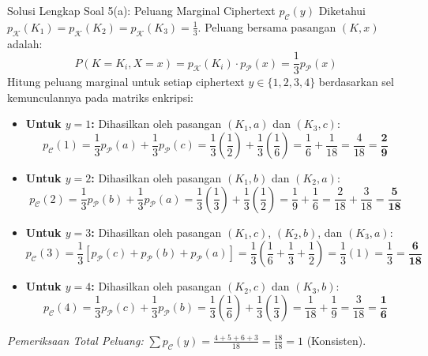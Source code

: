 \documentclass[11pt,a4paper]{article}
\begin{document}
\begin{solusibox}{Solusi Lengkap Soal 5(a): Peluang Marginal Ciphertext $p_{\mathcal{C}}(y)$}
Diketahui $p_{\mathcal{K}}(K_1) = p_{\mathcal{K}}(K_2) = p_{\mathcal{K}}(K_3) = \frac{1}{3}$. Peluang bersama pasangan $(K, x)$ adalah:
\[
P(K = K_i, X = x) = p_{\mathcal{K}}(K_i) \cdot p_{\mathcal{P}}(x) = \frac{1}{3} p_{\mathcal{P}}(x)
\]
Hitung peluang marginal untuk setiap ciphertext $y \in \{1, 2, 3, 4\}$ berdasarkan sel kemunculannya pada matriks enkripsi:
\begin{itemize}[leftmargin=*]
    \item \textbf{Untuk $y = 1$:} Dihasilkan oleh pasangan $(K_1, a)$ dan $(K_3, c)$:
    \[
    p_{\mathcal{C}}(1) = \frac{1}{3} p_{\mathcal{P}}(a) + \frac{1}{3} p_{\mathcal{P}}(c) = \frac{1}{3}\left(\frac{1}{2}\right) + \frac{1}{3}\left(\frac{1}{6}\right) = \frac{1}{6} + \frac{1}{18} = \frac{4}{18} = \mathbf{\frac{2}{9}}
    \]
    \item \textbf{Untuk $y = 2$:} Dihasilkan oleh pasangan $(K_1, b)$ dan $(K_2, a)$:
    \[
    p_{\mathcal{C}}(2) = \frac{1}{3} p_{\mathcal{P}}(b) + \frac{1}{3} p_{\mathcal{P}}(a) = \frac{1}{3}\left(\frac{1}{3}\right) + \frac{1}{3}\left(\frac{1}{2}\right) = \frac{1}{9} + \frac{1}{6} = \frac{2}{18} + \frac{3}{18} = \mathbf{\frac{5}{18}}
    \]
    \item \textbf{Untuk $y = 3$:} Dihasilkan oleh pasangan $(K_1, c)$, $(K_2, b)$, dan $(K_3, a)$:
    \[
    p_{\mathcal{C}}(3) = \frac{1}{3}\left[p_{\mathcal{P}}(c) + p_{\mathcal{P}}(b) + p_{\mathcal{P}}(a)\right] = \frac{1}{3}\left(\frac{1}{6} + \frac{1}{3} + \frac{1}{2}\right) = \frac{1}{3}(1) = \frac{1}{3} = \mathbf{\frac{6}{18}}
    \]
    \item \textbf{Untuk $y = 4$:} Dihasilkan oleh pasangan $(K_2, c)$ dan $(K_3, b)$:
    \[
    p_{\mathcal{C}}(4) = \frac{1}{3} p_{\mathcal{P}}(c) + \frac{1}{3} p_{\mathcal{P}}(b) = \frac{1}{3}\left(\frac{1}{6}\right) + \frac{1}{3}\left(\frac{1}{3}\right) = \frac{1}{18} + \frac{1}{9} = \frac{3}{18} = \mathbf{\frac{1}{6}}
    \]
\end{itemize}
\textit{Pemeriksaan Total Peluang:} $\sum p_{\mathcal{C}}(y) = \frac{4 + 5 + 6 + 3}{18} = \frac{18}{18} = 1$ (Konsisten).
\end{solusibox}

\vspace{0.3cm}
\end{document}
